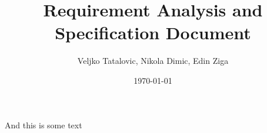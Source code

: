 \documentclass[a4paper,oneside,11pt]{article}
\title{Requirement Analysis and Specification Document}
\author{Veljko Tatalovic, Nikola Dimic, Edin Ziga}
\date{\today}
\begin{document}
And this is some text
\end{document}
